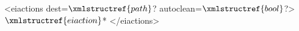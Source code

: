 <eiactions dest=$\xmlstructref{path}$? autoclean=$\xmlstructref{bool}$?>
  $\xmlstructref{eiaction}$*
</eiactions>
